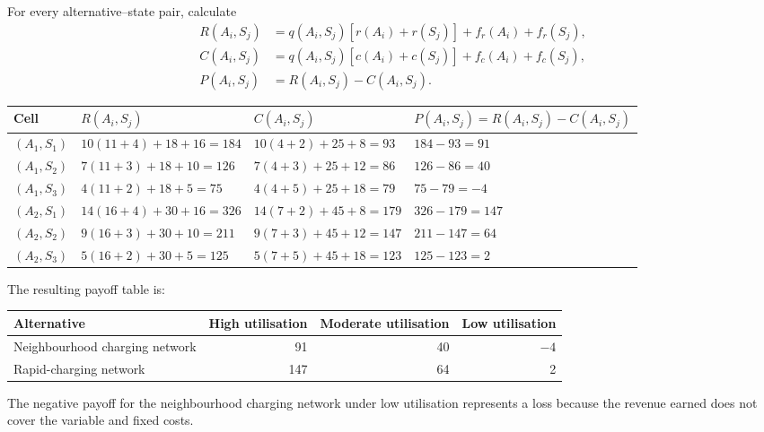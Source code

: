 For every alternative--state pair, calculate
\[
\begin{aligned}
	R(A_i,S_j)
	&=
	q(A_i,S_j)
	\left[
	r(A_i)+r(S_j)
	\right]
	+
	f_r(A_i)
	+
	f_r(S_j),
	\\
	C(A_i,S_j)
	&=
	q(A_i,S_j)
	\left[
	c(A_i)+c(S_j)
	\right]
	+
	f_c(A_i)
	+
	f_c(S_j),
	\\
	P(A_i,S_j)
	&=
	R(A_i,S_j)-C(A_i,S_j).
\end{aligned}
\]

\begin{center}
	\small
	\begin{tabular}{llll}
		\toprule
		Cell
		& \(R(A_i,S_j)\)
		& \(C(A_i,S_j)\)
		& \(P(A_i,S_j)=R(A_i,S_j)-C(A_i,S_j)\) \\
		\midrule
		\((A_1,S_1)\)
		& \(10(11+4)+18+16=184\)
		& \(10(4+2)+25+8=93\)
		& \(184-93=91\) \\
		
		\((A_1,S_2)\)
		& \(7(11+3)+18+10=126\)
		& \(7(4+3)+25+12=86\)
		& \(126-86=40\) \\
		
		\((A_1,S_3)\)
		& \(4(11+2)+18+5=75\)
		& \(4(4+5)+25+18=79\)
		& \(75-79=-4\) \\
		
		\((A_2,S_1)\)
		& \(14(16+4)+30+16=326\)
		& \(14(7+2)+45+8=179\)
		& \(326-179=147\) \\
		
		\((A_2,S_2)\)
		& \(9(16+3)+30+10=211\)
		& \(9(7+3)+45+12=147\)
		& \(211-147=64\) \\
		
		\((A_2,S_3)\)
		& \(5(16+2)+30+5=125\)
		& \(5(7+5)+45+18=123\)
		& \(125-123=2\) \\
		\bottomrule
	\end{tabular}
\end{center}

The resulting payoff table is:

\begin{center}
	\begin{tabular}{lrrr}
		\toprule
		Alternative
		& High utilisation
		& Moderate utilisation
		& Low utilisation \\
		\midrule
		Neighbourhood charging network & 91 & 40 & \(-4\) \\
		Rapid-charging network & 147 & 64 & 2 \\
		\bottomrule
	\end{tabular}
\end{center}

The negative payoff for the neighbourhood charging network under low
utilisation represents a loss because the revenue earned does not cover the
variable and fixed costs.



